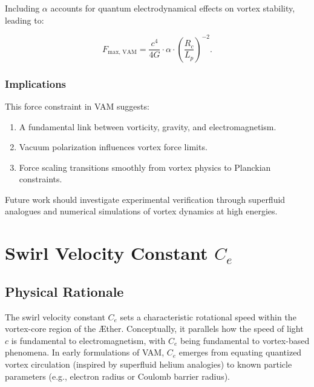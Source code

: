\documentclass[a4paper,12pt]{article}
\begin{document}
Including $\alpha$ accounts for quantum electrodynamical effects on vortex stability, leading to:


\begin{equation*}
    F_\text{max, VAM} = \frac{c^4}{4G} \cdot \alpha \cdot \left(\frac{R_c}{L_p}\right)^{-2}.
\end{equation*}


\subsubsection*{Implications}
This force constraint in VAM suggests:
\begin{enumerate}
    \item A fundamental link between vorticity, gravity, and electromagnetism.
    \item Vacuum polarization influences vortex force limits.
    \item Force scaling transitions smoothly from vortex physics to Planckian constraints.
\end{enumerate}


Future work should investigate experimental verification through superfluid analogues and numerical simulations of vortex dynamics at high energies.

\section{Swirl Velocity Constant \(C_e\)}

\subsection{Physical Rationale}
The swirl velocity constant \(C_e\) sets a characteristic rotational speed within the vortex-core region of the Æther. Conceptually, it parallels how the speed of light \(c\) is fundamental to electromagnetism, with \(C_e\) being fundamental to vortex-based phenomena. In early formulations of VAM, \(C_e\) emerges from equating quantized vortex circulation (inspired by superfluid helium analogies) to known particle parameters (e.g., electron radius or Coulomb barrier radius).
\end{document}
